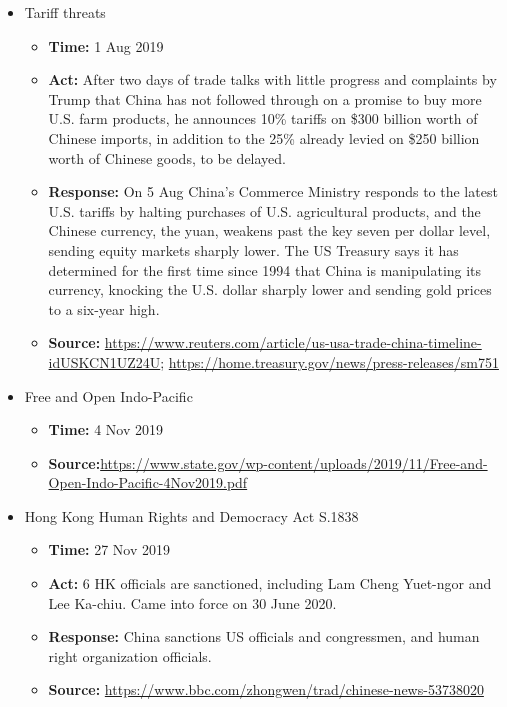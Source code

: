 \begin{itemize}
			\item Tariff threats
				\begin{itemize}
				\item \textbf{Time: } 1 Aug 2019
				\item \textbf{Act: }After two days of trade talks with little progress and complaints by Trump that China has not followed through on a promise to buy more U.S. farm products, he announces 10\% tariffs on \$300 billion worth of Chinese imports, in addition to the 25\% already levied on \$250 billion worth of Chinese goods, to be delayed.
				\item \textbf{Response: } On 5 Aug China’s Commerce Ministry responds to the latest U.S. tariffs by halting purchases of U.S. agricultural products, and the Chinese currency, the yuan, weakens past the key seven per dollar level, sending equity markets sharply lower. The US Treasury says it has determined for the first time since 1994 that China is manipulating its currency, knocking the U.S. dollar sharply lower and sending gold prices to a six-year high.
				\item	\textbf{Source: }\url{https://www.reuters.com/article/us-usa-trade-china-timeline-idUSKCN1UZ24U}; \url{https://home.treasury.gov/news/press-releases/sm751}
				\end{itemize}
			
			\item Free and Open Indo-Pacific
				\begin{itemize}
				\item \textbf{Time:} 4 Nov 2019
				\item \textbf{Source:}\url{https://www.state.gov/wp-content/uploads/2019/11/Free-and-Open-Indo-Pacific-4Nov2019.pdf}
				\end{itemize}
			
			\item Hong Kong Human Rights and Democracy Act S.1838
				\begin{itemize}
				\item \textbf{Time: }27 Nov 2019
				\item \textbf{Act: } 6 HK officials are sanctioned, including Lam Cheng Yuet-ngor and Lee Ka-chiu. Came into force on 30 June 2020.
				\item \textbf{Response: } China sanctions US officials and congressmen, and human right organization officials.
				\item	\textbf{Source: }\url{https://www.bbc.com/zhongwen/trad/chinese-news-53738020}
				\end{itemize}
				

\end{itemize}
